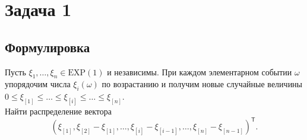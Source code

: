 \documentclass[specialist,
substylefile = spbu_report.rtx,
subf,href,colorlinks=true, 12pt]{disser}
\begin{document}
	
	\thispagestyle{empty}
	\tableofcontents
	\newpage
	\section{Задача 1}
	\subsection{Формулировка}
	Пусть $\xi_1,\dots,\xi_n\in \mathrm{EXP}(1)$ и независимы. При каждом элементарном событии $\omega$ упорядочим числа $\xi_i(\omega)$ по возрастанию и получим новые случайные величины $0\leqslant\xi_{[1]}\leqslant\dots\leqslant\xi_{[i]}\leqslant\dots\leqslant\xi_{[n]}$.\\
	Найти распределение вектора
	\begin{equation*}
		(\xi_{[1]},\xi_{[2]}-\xi_{[1]},\dots,\xi_{[i]}-\xi_{[i-1]},\dots,\xi_{[n]}-\xi_{[n-1]})^\mathsf{T}.
	\end{equation*}
\end{document}
